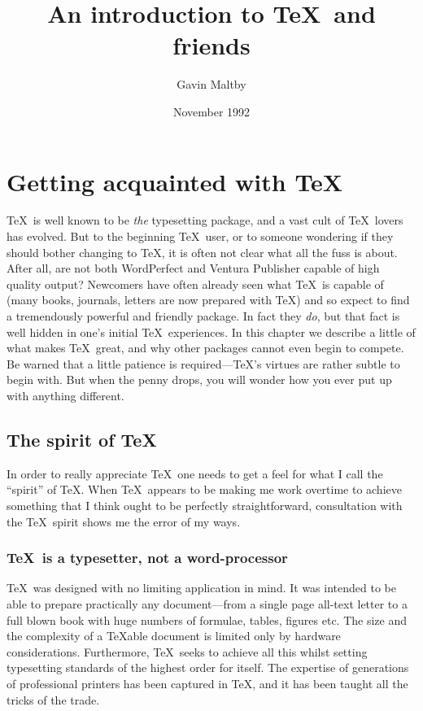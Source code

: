 

\title{An introduction to \TeX\ and friends}
\author{Gavin Maltby}
\date{November 1992}

\maketitle
\tableofcontents
\listoftables
\newpage
{}

\chapter{Getting acquainted with \TeX}
\TeX\ is well known to be {\em the\/} typesetting package,
and a vast cult of \TeX\ lovers has evolved.  But to the beginning
\TeX\ user, or to someone wondering if they should bother changing
to \TeX, it is often not clear what all the fuss is about.  After all,
are not both WordPerfect and Ventura Publisher capable of
high quality output?  Newcomers have often already seen what \TeX\
is capable of (many books, journals, letters are now prepared with \TeX)
and so expect to find a tremendously powerful and friendly package.
In fact they {\em do}, but that fact is well hidden in one's initial
\TeX\ experiences.  In this chapter we describe a little of what
makes \TeX\ great, and why other packages cannot even begin
to compete.  Be warned that a little patience is required---\TeX's
virtues are rather subtle to begin with.  But when the penny drops,
you will wonder how you ever put up with anything different.

\section{The spirit of \TeX}
In order to really appreciate \TeX\ one needs to get a feel
for what I call the ``spirit'' of \TeX.  When \TeX\
appears to be making me work overtime to achieve something
that I think ought to be perfectly straightforward, consultation
with the \TeX\ spirit shows me the error of my ways.

\subsection{\TeX\ is a typesetter, not a word-processor}
\TeX\ was designed with no limiting application in mind.
It was intended to be able to prepare practically any document---from
a single page all-text letter to a full blown book with huge numbers
of formulae, tables, figures etc.  The size and the complexity of a
{\TeX}able document is limited only by hardware considerations.
Furthermore, \TeX\ seeks to achieve all this whilst setting
typesetting standards of the highest order for itself.  The expertise
of generations of professional printers has been captured in
\TeX, and it has been taught all the tricks of the trade.


